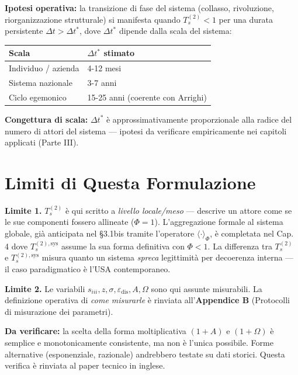 \Hypoth{} \textbf{Ipotesi operativa:} la transizione di fase del sistema
(collasso, rivoluzione, riorganizzazione strutturale) si manifesta
quando \(T_s^{(2)} < 1\) per una durata persistente
\(\Delta t > \Delta t^*\), dove \(\Delta t^*\) dipende dalla scala del
sistema:

{\def\LTcaptype{none} %
{\small\begin{longtable}[]{@{}ll@{}}
\toprule\noalign{}
Scala & \(\Delta t^*\) stimato \\
\midrule\noalign{}
\endhead
\bottomrule\noalign{}
\endlastfoot
Individuo / azienda & 4-12 mesi \\
Sistema nazionale & 3-7 anni \\
Ciclo egemonico & 15-25 anni (coerente con Arrighi) \\
\end{longtable}}
}

\Conj{} \textbf{Congettura di scala:} \(\Delta t^*\) è
approssimativamente proporzionale alla radice del numero di attori del
sistema --- ipotesi da verificare empiricamente nei capitoli applicati
(Parte III).



\section{Limiti di Questa
Formulazione}\label{limiti-di-questa-formulazione}

\Conj{} \textbf{Limite 1.} \(T_s^{(2)}\) è qui scritto a \emph{livello
locale/meso} --- descrive un attore come se le sue componenti fossero
allineate (\(\Phi = 1\)). L'aggregazione formale al sistema globale, già
anticipata nel \S{}3.1bis tramite l'operatore \(\langle\cdot\rangle_\Phi\),
è completata nel Cap. 4 dove \(T_s^{(2),\text{sys}}\) assume la sua
forma definitiva con \(\Phi < 1\). La differenza tra \(T_s^{(2)}\) e
\(T_s^{(2),\text{sys}}\) misura quanto un sistema \emph{spreca}
legittimità per decoerenza interna --- il caso paradigmatico è l'USA
contemporaneo.

\Conj{} \textbf{Limite 2.} Le variabili
\(s_{iii}, z, \sigma, \varepsilon_{\text{dis}}, A, \Omega\) sono qui
assunte misurabili. La definizione operativa di \emph{come misurarle} è
rinviata all'\textbf{Appendice B} (Protocolli di misurazione dei
parametri).

\ToVerify{} \textbf{Da verificare:} la scelta della forma moltiplicativa
\((1+A)\) e \((1+\Omega)\) è semplice e monotonicamente consistente, ma
non è l'unica possibile. Forme alternative (esponenziale, razionale)
andrebbero testate su dati storici. Questa verifica è rinviata al paper
tecnico in inglese.



